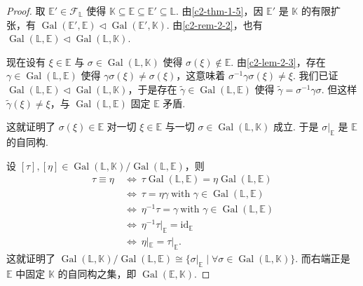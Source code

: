 \begin{proof}
取 $\mathbb{E}'\in\mathcal{F}_{\mathbb{L}}$ 使得 $\mathbb{K}\subseteq\mathbb{E}\subseteq\mathbb{E}'\subseteq\mathbb{L}$. 由\autoref{c2-thm-1-5}，因 $\mathbb{E}'$ 是 $\mathbb{K}$ 的有限扩张，有 $\operatorname{Gal}(\mathbb{E}',\mathbb{E})\triangleleft\operatorname{Gal}(\mathbb{E}',\mathbb{K})$. 由\autoref{c2-rem-2-2}，也有 $\operatorname{Gal}(\mathbb{L},\mathbb{E})\triangleleft\operatorname{Gal}(\mathbb{L},\mathbb{K})$.

现在设有 $\xi\in\mathbb{E}$ 与 $\sigma\in\operatorname{Gal}(\mathbb{L},\mathbb{K})$ 使得 $\sigma(\xi)\notin\mathbb{E}$. 由\autoref{c2-lem-2-3}，存在 $\gamma\in\operatorname{Gal}(\mathbb{L},\mathbb{E})$ 使得 $\gamma\sigma(\xi)\neq\sigma(\xi)$，这意味着 $\sigma^{-1}\gamma\sigma(\xi)\neq\xi$. 我们已证 $\operatorname{Gal}(\mathbb{L},\mathbb{E})\triangleleft\operatorname{Gal}(\mathbb{L},\mathbb{K})$，于是存在 $\widetilde{\gamma}\in\operatorname{Gal}(\mathbb{L},\mathbb{E})$ 使得 $\widetilde{\gamma}=\sigma^{-1}\gamma\sigma$. 但这样 $\widetilde{\gamma}(\xi)\neq\xi$，与 $\operatorname{Gal}(\mathbb{L},\mathbb{E})$ 固定 $\mathbb{E}$ 矛盾.

这就证明了 $\sigma(\xi)\in\mathbb{E}$ 对一切 $\xi\in\mathbb{E}$ 与一切 $\sigma\in\operatorname{Gal}(\mathbb{L},\mathbb{K})$ 成立. 于是 $\sigma|_{\mathbb{E}}$ 是 $\mathbb{E}$ 的自同构.

设 $[\tau],[\eta]\in\operatorname{Gal}(\mathbb{L},\mathbb{K})/\operatorname{Gal}(\mathbb{L},\mathbb{E})$，则
\[
\begin{aligned}
\tau\equiv\eta\ &\Leftrightarrow\ \tau\operatorname{Gal}(\mathbb{L},\mathbb{E})=\eta\operatorname{Gal}(\mathbb{L},\mathbb{E})\\
&\Leftrightarrow\ \tau=\eta\gamma\ \text{with }\gamma\in\operatorname{Gal}(\mathbb{L},\mathbb{E})\\
&\Leftrightarrow\ \eta^{-1}\tau=\gamma\ \text{with }\gamma\in\operatorname{Gal}(\mathbb{L},\mathbb{E})\\
&\Leftrightarrow\ \eta^{-1}\tau|_{\mathbb{E}}=\mathrm{id}_{\mathbb{E}}\\
&\Leftrightarrow\ \eta|_{\mathbb{E}}=\tau|_{\mathbb{E}}.
\end{aligned}
\]
这就证明了 $\operatorname{Gal}(\mathbb{L},\mathbb{K})/\operatorname{Gal}(\mathbb{L},\mathbb{E})\cong\{\sigma|_{\mathbb{E}}\mid\forall\sigma\in\operatorname{Gal}(\mathbb{L},\mathbb{K})\}$. 而右端正是 $\mathbb{E}$ 中固定 $\mathbb{K}$ 的自同构之集，即 $\operatorname{Gal}(\mathbb{E},\mathbb{K})$.
\end{proof}

